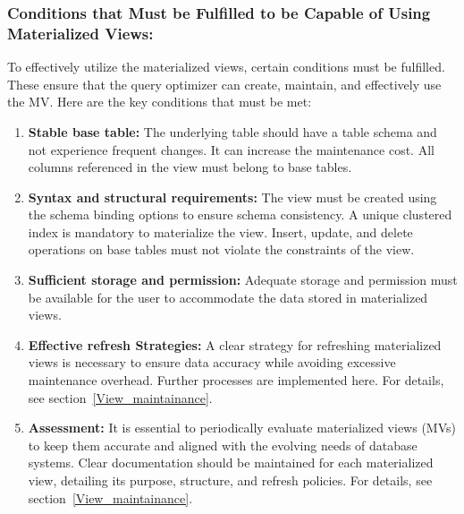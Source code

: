 \subsubsection{Conditions that Must be Fulfilled to be Capable of Using Materialized Views:}
To effectively utilize the materialized views, certain conditions must be fulfilled. These ensure that the query optimizer can create, maintain, and effectively use the MV. Here are the key conditions that must be met:

\begin{enumerate}[label=\alph*)]
    \item \textbf{Stable base table:} The underlying table should have a table schema and not experience frequent changes. It can increase the maintenance cost. All columns referenced in the view must belong to base tables.
    
    \item \textbf{Syntax and structural requirements:} The view must be created using the schema binding options to ensure schema consistency. A unique clustered index is mandatory to materialize the view. Insert, update, and delete operations on base tables must not violate the constraints of the view.
    
    \item \textbf{Sufficient storage and permission:} Adequate storage and permission must be available for the user to accommodate the data stored in materialized views.
    
    \item \textbf{Effective refresh Strategies:} A clear strategy for refreshing materialized views is necessary to ensure data accuracy while avoiding excessive maintenance overhead. Further processes are implemented here. For details, see section~\ref{View_maintainance}.
    
    \item \textbf{Assessment:} It is essential to periodically evaluate materialized views (MVs) to keep them accurate and aligned with the evolving needs of database systems. Clear documentation should be maintained for each materialized view, detailing its purpose, structure, and refresh policies. For details, see section~\ref{View_maintainance}.
    
\end{enumerate}



